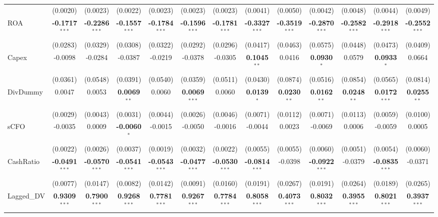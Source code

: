 \documentclass[11pt,a4paper]{article}
\begin{document}
\begin{table}[htbp]
\begin{tabular}{lcccccccccccc}
 & (0.0020) & (0.0023) & (0.0022) & (0.0023) & (0.0023) & (0.0023) & (0.0041) & (0.0050) & (0.0042) & (0.0048) & (0.0044) & (0.0049) \\
ROA & \textbf{-0.1717}$^{***}$ & \textbf{-0.2286}$^{***}$ & \textbf{-0.1557}$^{***}$ & \textbf{-0.1784}$^{***}$ & \textbf{-0.1596}$^{***}$ & \textbf{-0.1781}$^{***}$ & \textbf{-0.3327}$^{***}$ & \textbf{-0.3519}$^{***}$ & \textbf{-0.2870}$^{***}$ & \textbf{-0.2582}$^{***}$ & \textbf{-0.2918}$^{***}$ & \textbf{-0.2552}$^{***}$ \\
 & (0.0283) & (0.0329) & (0.0308) & (0.0322) & (0.0292) & (0.0296) & (0.0417) & (0.0463) & (0.0575) & (0.0448) & (0.0473) & (0.0409) \\
Capex & -0.0098 & -0.0284 & -0.0387 & -0.0219 & -0.0378 & -0.0305 & \textbf{0.1045}$^{**}$ & 0.0416 & \textbf{0.0930}$^{*}$ & 0.0579 & \textbf{0.0933}$^{*}$ & 0.0664 \\
 & (0.0361) & (0.0548) & (0.0391) & (0.0540) & (0.0359) & (0.0511) & (0.0430) & (0.0874) & (0.0516) & (0.0854) & (0.0565) & (0.0814) \\
DivDummy & 0.0047 & 0.0053 & \textbf{0.0069}$^{**}$ & 0.0060 & \textbf{0.0069}$^{***}$ & 0.0060 & \textbf{0.0139}$^{*}$ & \textbf{0.0230}$^{**}$ & \textbf{0.0162}$^{**}$ & \textbf{0.0248}$^{**}$ & \textbf{0.0172}$^{***}$ & \textbf{0.0255}$^{**}$ \\
 & (0.0029) & (0.0043) & (0.0031) & (0.0044) & (0.0026) & (0.0046) & (0.0071) & (0.0112) & (0.0071) & (0.0113) & (0.0059) & (0.0100) \\
sCFO & -0.0035 & 0.0009 & \textbf{-0.0060}$^{*}$ & -0.0015 & -0.0050 & -0.0016 & -0.0044 & 0.0023 & -0.0069 & 0.0006 & -0.0059 & 0.0005 \\
 & (0.0022) & (0.0026) & (0.0037) & (0.0019) & (0.0032) & (0.0022) & (0.0055) & (0.0055) & (0.0060) & (0.0051) & (0.0054) & (0.0060) \\
CashRatio & \textbf{-0.0491}$^{***}$ & \textbf{-0.0570}$^{***}$ & \textbf{-0.0541}$^{***}$ & \textbf{-0.0543}$^{***}$ & \textbf{-0.0477}$^{***}$ & \textbf{-0.0530}$^{***}$ & \textbf{-0.0814}$^{***}$ & -0.0398 & \textbf{-0.0922}$^{***}$ & -0.0379 & \textbf{-0.0835}$^{***}$ & -0.0371 \\
 & (0.0077) & (0.0147) & (0.0082) & (0.0142) & (0.0091) & (0.0160) & (0.0191) & (0.0267) & (0.0191) & (0.0264) & (0.0189) & (0.0265) \\
Lagged\_DV & \textbf{0.9309}$^{***}$ & \textbf{0.7900}$^{***}$ & \textbf{0.9268}$^{***}$ & \textbf{0.7781}$^{***}$ & \textbf{0.9267}$^{***}$ & \textbf{0.7784}$^{***}$ & \textbf{0.8058}$^{***}$ & \textbf{0.4073}$^{***}$ & \textbf{0.8032}$^{***}$ & \textbf{0.3955}$^{***}$ & \textbf{0.8021}$^{***}$ & \textbf{0.3937}$^{***}$ \\

\end{tabular}
\end{table}
\end{document}
